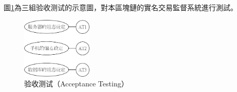 \begin{enumerate}
				圖\ref{AcceptanceTesting}為三組验收测试的示意圖，對本區塊鏈的實名交易監督系統進行測試。
					\begin{figure}[htbp]
						\centering
						\includegraphics[width = 0.3\textwidth]{AcceptanceTesting.png}
						\caption{验收测试（Acceptance Testing）}\label{AcceptanceTesting}
					\end{figure}

	 		\end{enumerate}			


